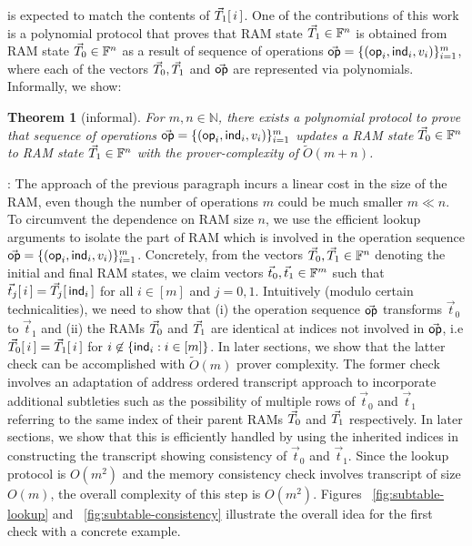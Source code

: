 \documentclass[11pt]{article}
\newtheorem{theorem}{Theorem}[section]
\begin{document}
    is expected to match the contents of $\vec{T}_1[\,i\,]$. One of the contributions of this work is a polynomial protocol that proves that RAM state
    $\vec{T}_1\in \mathbb{F}^n$ is obtained from RAM state $\vec{T}_0\in \mathbb{F}^n$ as a result of sequence of operations $\vec{\mathsf{op}}=\{(\mathsf{op}_i,\mathsf{ind}_i,v_i)\}_{i=1}^m$, where each
    of the vectors $\vec{T}_0,\vec{T}_1$ and $\vec{\mathsf{op}}$ are represented via polynomials. Informally, we show:
    \begin{theorem}[informal]\label{thm:pp-for-ram-informal}
    For $m,n\in \mathbb{N}$, there exists a polynomial protocol to prove that sequence of operations $\vec{\mathsf{op}}=\{(\mathsf{op}_i,\mathsf{ind}_i,v_i)\}_{i=1}^m$ updates a
    RAM state $\vec{T}_0\in \mathbb{F}^n$ to RAM state $\vec{T}_1\in \mathbb{F}^n$ with the prover-complexity of $\tilde{O}(m+n)$.
    \end{theorem}

    : The approach of the previous paragraph incurs a linear cost in
    the size of the RAM, even though the number of operations $m$ could be much smaller $m\ll n$. To circumvent the
    dependence on RAM size $n$, we use the efficient lookup arguments to isolate the part of RAM which is involved
    in the operation sequence $\vec{\mathsf{op}}=\{(\mathsf{op}_i,\mathsf{ind}_i,v_i)\}_{i=1}^m$.
    Concretely, from the vectors $\vec{T}_0,\vec{T}_1\in \mathbb{F}^n$ denoting the initial and final RAM states, we claim
    vectors $\vec{t}_0, \vec{t}_1\in \mathbb{F}^m$ such that $\vec{t}_j[\,i\,] = \vec{T}_j[\,\mathsf{ind}_i\,]$ for all $i\in [m]$ and
    $j=0,1$. Intuitively (modulo certain technicalities), we need to show that (i) the operation sequence $\vec{\mathsf{op}}$
    transforms $\vec{t}_0$ to $\vec{t}_1$ and (ii) the RAMs $\vec{T}_0$ and $\vec{T}_1$ are identical at indices not
    involved in $\vec{\mathsf{op}}$, i.e $\vec{T}_0[\,i\,]=\vec{T}_1[\,i\,]$ for $i\not\in \{\mathsf{ind}_i: i\in [m]\}$. In later
    sections, we show that the latter check can be accomplished with $\tilde{O}(m)$ prover complexity. The former
    check involves an adaptation of address ordered transcript approach to incorporate additional subtleties such
    as the possibility of multiple rows of $\vec{t}_0$ and $\vec{t}_1$ referring to the same index of their parent RAMs $\vec{T}_0$ and
    $\vec{T}_1$ respectively.
    In later sections, we show that this is efficiently handled by using the inherited indices in constructing the transcript showing
    consistency of $\vec{t}_0$ and $\vec{t}_1$. Since the lookup protocol is $O(m^2)$ and the memory consistency check involves transcript
    of size $O(m)$, the overall complexity of this step is $O(m^2)$. Figures ~\ref{fig:subtable-lookup} and ~\ref{fig:subtable-consistency}
    illustrate the overall idea for the first check with a concrete example.
\end{document}
